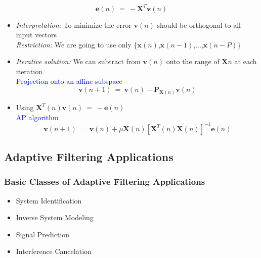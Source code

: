 \documentclass[12pt,hyperref=true,mathserif]{beamer}
\begin{document}
\begin{frame}
\begin{equation}\label{equ:ErrorV}
  \mathbf{e}(n)~=~-\mathbf{X}^{T}\mathbf{v}(n)
\end{equation}
\begin{itemize}
  \item \emph{Interpretation:} To minimize the error $\mathbf{v}(n)$ should be orthogonal to all input vectors\\
  \emph{Restriction:} We are going to use only \{$\mathbf{x}(n)$,$\mathbf{x}(n-1)$,$\ldots$,$\mathbf{x}(n-P)$\}
\end{itemize}
\begin{itemize}
  \item \emph{Iterative solution:} We can subtract from $\mathbf{v}(n)$ onto the range of $\mathbf{X}{n}$ at
  each iteration\\
  \textcolor{blue}{Projection onto an affine subspace}
  \begin{equation}\label{equ:ProjectionOntoSubspace}
  \mathbf{v}(n+1)~=~\mathbf{v}(n)-\mathbf{P}_{\mathbf{X}(n)}\mathbf{v}(n)
  \end{equation}
\end{itemize}
\begin{itemize}
  \item Using $\mathbf{X}^{T}(n)\mathbf{v}(n)~=~-\mathbf{e}(n)$\\
  \textcolor{blue}{AP algorithm}
  \begin{equation}\label{equ:AffineProjectionAlgo}
    \mathbf{v}(n+1)~=~\mathbf{v}(n)+\mu\mathbf{X}(n)[\mathbf{X}^{T}(n)\mathbf{X}(n)]^{-1}\mathbf{e}(n)
  \end{equation}
\end{itemize}
\end{frame}

\subsection{Adaptive Filtering Applications}
\begin{frame}
\frametitle{Basic Classes of Adaptive Filtering Applications}
\begin{itemize}
  \item System Identification
  \item Inverse System Modeling
  \item Signal Prediction
  \item Interference Cancelation
\end{itemize}
\end{frame}
\end{document}
